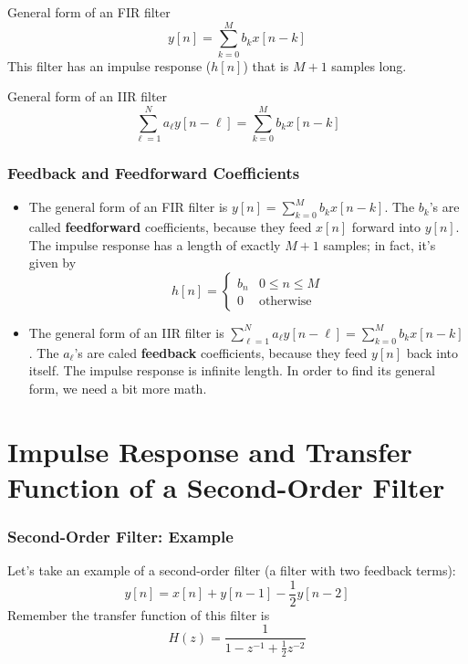 \begin{frame}
  \begin{block}{General form of an FIR filter}
    \[
    y[n] = \sum_{k=0}^{M} b_k x[n-k]
    \]
    This filter has an impulse response ($h[n]$) that is $M+1$ samples
    long.
  \end{block}
  \begin{block}{General form of an IIR filter}
    \[
    \sum_{\ell=1}^N a_\ell y[n-\ell] = \sum_{k=0}^{M} b_k x[n-k]
    \]
  \end{block}
\end{frame}

\begin{frame}
  \frametitle{Feedback and Feedforward Coefficients}

  \begin{itemize}
  \item The general form of an FIR filter is $y[n] = \sum_{k=0}^{M}
    b_k x[n-k]$.  The $b_k$'s are called {\bf feedforward}
    coefficients, because they feed $x[n]$ forward into $y[n]$.  The
    impulse response has a length of exactly $M+1$ samples; in fact,
    it's given by
    \[h[n] = \begin{cases} b_n & 0\le n\le M\\0& \mbox{otherwise}\end{cases}\]
  \item The general form of an IIR filter is $\sum_{\ell=1}^N a_\ell
    y[n-\ell] = \sum_{k=0}^{M} b_k x[n-k]$.  The $a_\ell$'s are caled
    {\bf feedback} coefficients, because they feed $y[n]$ back into
    itself.  The impulse response is infinite length.  In order to
    find its general form, we need a bit more math.
  \end{itemize}
\end{frame}


\section[Second-Order]{Impulse Response and Transfer Function of a Second-Order Filter}
\setcounter{subsection}{1}

\begin{frame}
  \frametitle{Second-Order Filter: Example}

  Let's take an example of a second-order filter (a filter with two
  feedback terms):
  \[
  y[n] = x[n] + y[n-1] - \frac{1}{2}y[n-2]
  \]
  Remember the transfer function of this filter is
  \[
  H(z) = \frac{1}{1-z^{-1}+\frac{1}{2}z^{-2}}
  \]
\end{frame}

